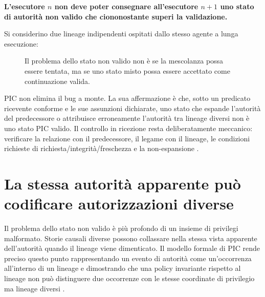 \documentclass[10pt,oneside,openany]{book}
\begin{document}
\begin{center}
\sffamily\bfseries
L'esecutore $n$ non deve poter consegnare all'esecutore $n+1$ uno stato di autorità non valido che ciononostante superi la validazione.
\end{center}

Si considerino due lineage indipendenti ospitati dallo stesso agente a lunga esecuzione:

\begin{figure}[ht]
\centering
{}
\caption{Il problema dello stato non valido non è se la mescolanza possa essere tentata, ma se uno stato misto possa essere accettato come continuazione valida.}
\end{figure}

PIC non elimina il bug a monte. La sua affermazione è che, sotto un predicato ricevente conforme e le sue assunzioni dichiarate, uno stato che espande l'autorità del predecessore o attribuisce erroneamente l'autorità tra lineage diversi non è uno stato PIC valido. Il controllo in ricezione resta deliberatamente meccanico: verificare la relazione con il predecessore, il legame con il lineage, le condizioni richieste di richiesta/integrità/freschezza e la non-espansione \cite{picwhy}.


\section{La stessa autorità apparente può codificare autorizzazioni diverse}
Il problema dello stato non valido è più profondo di un insieme di privilegi malformato. Storie causali diverse possono collassare nella stessa vista apparente dell'autorità quando il lineage viene dimenticato. Il modello formale di PIC rende preciso questo punto rappresentando un evento di autorità come un'occorrenza all'interno di un lineage e dimostrando che una policy invariante rispetto al lineage non può distinguere due occorrenze con le stesse coordinate di privilegio ma lineage diversi \cite{gallo2026pic}.
\end{document}
